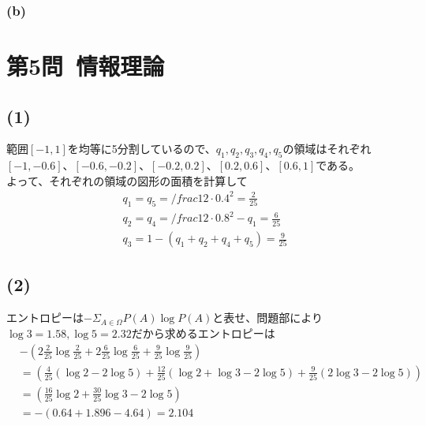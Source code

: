 \documentclass[a4paper,12pt,xelatex,ja=standard]{bxjsarticle}
\begin{document}
    \subsubsection*{(b)}

\section*{第5問\ 情報理論}
  \subsection*{(1)}
  範囲$[-1, 1]$を均等に5分割しているので、$q_1,q_2,q_3,q_4,q_5$の領域はそれぞれ$[-1, -0.6]$、$[-0.6, -0.2]$、$[-0.2, 0.2]$、$[0.2, 0.6]$、$[0.6, 1]$である。\\
  よって、それぞれの領域の図形の面積を計算して
  \begin{equation*}
    \begin{split}
      q_1 = q_5 = /frac{1}{2} \cdot 0.4^{2} = \frac{2}{25} \\
      q_2 = q_4 = /frac{1}{2} \cdot 0.8^{2}  - q_1 = \frac{6}{25} \\
      q_3 = 1 - (q_1 + q_2 + q_4 + q_5) = \frac{9}{25}
    \end{split}
  \end{equation*}

  \subsection*{(2)}
  エントロピーは$-\Sigma_{A \in \Omega} P(A) \log P(A)$と表せ、問題部により$\log 3 = 1.58, \log 5 = 2.32$だから求めるエントロピーは
  \begin{equation*}
    \begin{split}
    &-(2\frac{2}{25}\log \frac{2}{25} + 2 \frac{6}{25} \log \frac{6}{25} + \frac{9}{25} \log \frac{9}{25}) \\
    &= (\frac{4}{25}(\log 2 - 2 \log 5) + \frac{12}{25}(\log 2 + \log 3 - 2 \log 5) + \frac{9}{25}(2 \log 3 - 2 \log 5)) \\
    &= (\frac{16}{25} \log 2 + \frac{30}{25} \log 3 - 2 \log 5) \\
    &= -(0.64 + 1.896 - 4.64) = 2.104
    \end{split}
  \end{equation*}
\end{document}
